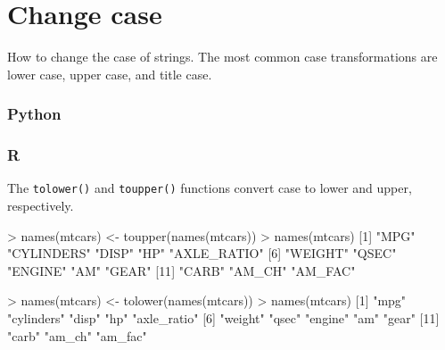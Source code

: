 \documentclass[
]{book}
\newenvironment{Shaded}{\begin{snugshade}}{\end{snugshade}}
\newcommand{\DecValTok}[1]{\textcolor[rgb]{0.00,0.00,0.81}{#1}}
\newcommand{\FunctionTok}[1]{\textcolor[rgb]{0.00,0.00,0.00}{#1}}
\newcommand{\NormalTok}[1]{#1}
\newcommand{\OtherTok}[1]{\textcolor[rgb]{0.56,0.35,0.01}{#1}}
\newcommand{\SpecialCharTok}[1]{\textcolor[rgb]{0.00,0.00,0.00}{#1}}
\newcommand{\StringTok}[1]{\textcolor[rgb]{0.31,0.60,0.02}{#1}}
\begin{document}
\hypertarget{change-case}{%
\section{Change case}\label{change-case}}

How to change the case of strings. The most common case transformations are lower case, upper case, and title case.

\hypertarget{python-20}{%
\subsubsection*{Python}\label{python-20}}

\hypertarget{r-20}{%
\subsubsection*{R}\label{r-20}}

The \texttt{tolower()} and \texttt{toupper()} functions convert case to lower and upper, respectively.

\begin{Shaded}
\begin{Highlighting}[]
\SpecialCharTok{\textgreater{}} \FunctionTok{names}\NormalTok{(mtcars) }\OtherTok{\textless{}{-}} \FunctionTok{toupper}\NormalTok{(}\FunctionTok{names}\NormalTok{(mtcars))}
\SpecialCharTok{\textgreater{}} \FunctionTok{names}\NormalTok{(mtcars)}
\NormalTok{ [}\DecValTok{1}\NormalTok{] }\StringTok{"MPG"}        \StringTok{"CYLINDERS"}  \StringTok{"DISP"}       \StringTok{"HP"}         \StringTok{"AXLE\_RATIO"}
\NormalTok{ [}\DecValTok{6}\NormalTok{] }\StringTok{"WEIGHT"}     \StringTok{"QSEC"}       \StringTok{"ENGINE"}     \StringTok{"AM"}         \StringTok{"GEAR"}      
\NormalTok{[}\DecValTok{11}\NormalTok{] }\StringTok{"CARB"}       \StringTok{"AM\_CH"}      \StringTok{"AM\_FAC"}    
\end{Highlighting}
\end{Shaded}

\begin{Shaded}
\begin{Highlighting}[]
\SpecialCharTok{\textgreater{}} \FunctionTok{names}\NormalTok{(mtcars) }\OtherTok{\textless{}{-}} \FunctionTok{tolower}\NormalTok{(}\FunctionTok{names}\NormalTok{(mtcars))}
\SpecialCharTok{\textgreater{}} \FunctionTok{names}\NormalTok{(mtcars)}
\NormalTok{ [}\DecValTok{1}\NormalTok{] }\StringTok{"mpg"}        \StringTok{"cylinders"}  \StringTok{"disp"}       \StringTok{"hp"}         \StringTok{"axle\_ratio"}
\NormalTok{ [}\DecValTok{6}\NormalTok{] }\StringTok{"weight"}     \StringTok{"qsec"}       \StringTok{"engine"}     \StringTok{"am"}         \StringTok{"gear"}      
\NormalTok{[}\DecValTok{11}\NormalTok{] }\StringTok{"carb"}       \StringTok{"am\_ch"}      \StringTok{"am\_fac"}    
\end{Highlighting}
\end{Shaded}
\end{document}
